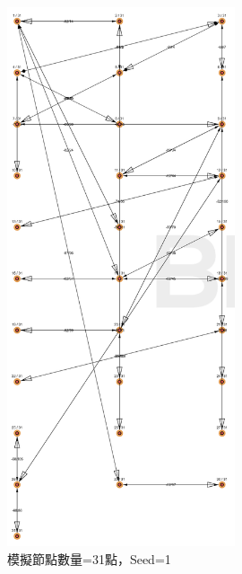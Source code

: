 \begin{ZhChapter}
\begin{figure}[H]
    \centering
    \includegraphics[width = 0.6\textwidth]{image/模擬實驗31點seed=1.png}
    \caption{模擬節點數量=31點，Seed=1}
    \label{fig: 模擬實驗31點seed=1}
\end{figure}


\end{ZhChapter}
